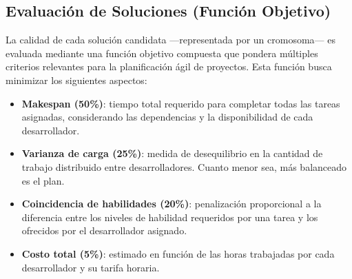 



\subsection{Evaluación de Soluciones (Función Objetivo)}
\label{sec:evaluacion}

La calidad de cada solución candidata —representada por un cromosoma— es evaluada mediante una función objetivo compuesta que pondera múltiples criterios relevantes para la planificación ágil de proyectos. Esta función busca minimizar los siguientes aspectos:

\begin{itemize}
    \item \textbf{Makespan (50\%)}: tiempo total requerido para completar todas las tareas asignadas, considerando las dependencias y la disponibilidad de cada desarrollador.
    \item \textbf{Varianza de carga (25\%)}: medida de desequilibrio en la cantidad de trabajo distribuido entre desarrolladores. Cuanto menor sea, más balanceado es el plan.
    \item \textbf{Coincidencia de habilidades (20\%)}: penalización proporcional a la diferencia entre los niveles de habilidad requeridos por una tarea y los ofrecidos por el desarrollador asignado.
    \item \textbf{Costo total (5\%)}: estimado en función de las horas trabajadas por cada desarrollador y su tarifa horaria.
\end{itemize}

